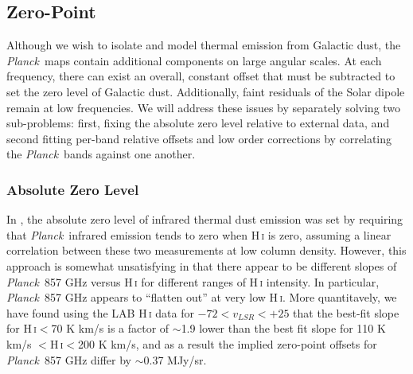 \documentclass{emulateapj}
\newcommand{\PLANCK}{{\it Planck}}
\begin{document}
\subsection{Zero-Point}
\label{sec:zp}



Although we wish to isolate and model thermal emission from Galactic dust, the
\PLANCK~maps contain additional components on large angular scales. At each 
frequency, there can exist an overall, constant offset that must be subtracted 
to set the zero level of Galactic dust. Additionally, faint residuals of the 
Solar dipole remain at low frequencies. We will address these issues by
separately solving two sub-problems: first, fixing the absolute zero level 
relative to external data, and second fitting per-band relative offsets 
and low order corrections by correlating the \PLANCK~bands against one another.

\subsubsection{Absolute Zero Level}
In \cite{planckdust}, the absolute zero level of infrared thermal dust emission
was set by requiring that \PLANCK~infrared emission tends to zero when 
H\,\textsc{i} is zero, assuming a linear correlation between these two 
measurements at low column density. However, this approach is somewhat
unsatisfying in that there appear to be different slopes of \PLANCK~857 GHz 
versus H\,\textsc{i} for different ranges of H\,\textsc{i} intensity. In 
particular, \PLANCK~857 GHz appears to ``flatten out'' at very low 
H\,\textsc{i}. More quantitavely, we have found using the LAB H\,\textsc{i} 
data \citep{lab} for $-72$$<$$v_{LSR}$$<$$+25$ that the best-fit slope for 
H\,\textsc{i}$<$70 K km/s is a factor of $\sim$1.9 lower than the best fit 
slope for 110 K km/s $<$H\,\textsc{i}$<$200 K km/s, and as a result the implied
zero-point offsets for \PLANCK~857 GHz differ by $\sim$0.37 MJy/sr.

\end{document}
